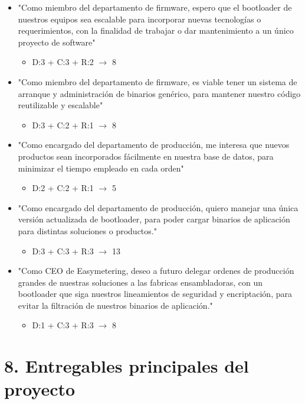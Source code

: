 \documentclass[
11pt, %
]{charter}
\begin{document}
\begin{itemize}
	\item "Como miembro del departamento de firmware, espero que el bootloader de nuestros equipos sea escalable para incorporar nuevas tecnologías o requerimientos, con la finalidad de trabajar o dar mantenimiento a un único proyecto de software"
	\begin{itemize}
		\item D:3 + C:3 + R:2 $\rightarrow$ 8
	\end{itemize}
	\item "Como miembro del departamento de firmware, es viable tener un sistema de arranque y administración de binarios genérico, para mantener nuestro código reutilizable y escalable"
	\begin{itemize}
		\item D:3 + C:2 + R:1 $\rightarrow$ 8
	\end{itemize}
	\item "Como encargado del departamento de producción, me interesa que nuevos productos sean incorporados fácilmente en nuestra base de datos, para minimizar el tiempo empleado en cada orden"
	\begin{itemize}
		\item D:2 + C:2 + R:1 $\rightarrow$ 5
	\end{itemize}
	\item "Como encargado del departamento de producción, quiero manejar una única versión actualizada de bootloader, para poder cargar binarios de aplicación para distintas soluciones o productos."
	\begin{itemize}
		\item D:3 + C:3 + R:3 $\rightarrow$ 13
	\end{itemize}
	\item "Como CEO de Easymetering, deseo a futuro delegar ordenes de producción grandes de nuestras soluciones a las fabricas ensambladoras, con un bootloader que siga nuestros lineamientos de seguridad y encriptación, para evitar la filtración de nuestros binarios de aplicación."
	\begin{itemize}
		\item D:1 + C:3 + R:3 $\rightarrow$ 8
	\end{itemize}
\end{itemize}

\section{8. Entregables principales del proyecto}
\label{sec:entregables}
\end{document}
